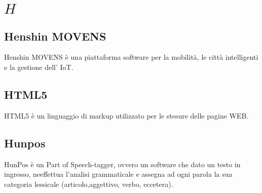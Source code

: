 \section{\quad$H\quad$}
\subsection{Henshin MOVENS}
Henshin MOVENS è una piattaforma software per la mobilità, le città intelligenti e la gestione dell' IoT.

\subsection{HTML5}
HTML5 è un linguaggio di markup utilizzato per le stesure delle pagine WEB.

\subsection{Hunpos}
HunPos è un Part of Speech-tagger, ovvero un software che dato un testo in ingresso, neeffettua l’analisi grammaticale e assegna ad ogni parola la sua categoria lessicale (articolo,aggettivo, verbo, eccetera).

